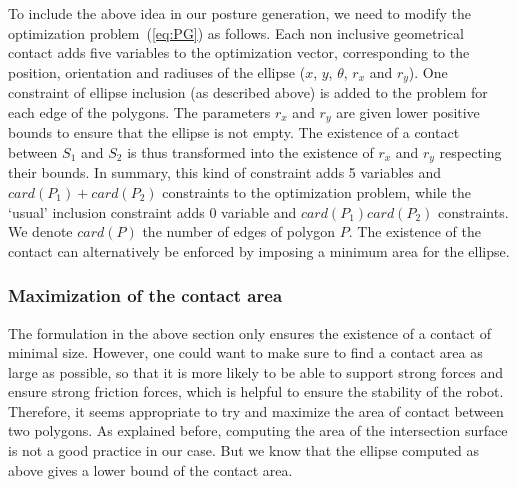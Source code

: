
To include the above idea in our posture generation, we need to modify the optimization problem~(\ref{eq:PG}) as follows.
Each non inclusive geometrical contact adds five variables to the optimization vector, corresponding to the position, orientation and radiuses of the ellipse ($x$, $y$, $\theta$, $r_x$ and $r_y$).
One constraint of ellipse inclusion (as described above) is added to the problem for each edge of the polygons.
The parameters $r_x$ and $r_y$ are given lower positive bounds to ensure that the ellipse is not empty.
The existence of a contact between $S_1$ and $S_2$ is thus transformed into the existence of $r_x$ and $r_y$ respecting their bounds.
In summary, this kind of constraint adds 5 variables and $card(P_1)+card(P_2)$ constraints to the optimization problem, while the `usual' inclusion constraint adds 0 variable and $card(P_1)card(P_2)$ constraints.
We denote $card(P)$ the number of edges of polygon $P$.
The existence of the contact can alternatively be enforced by imposing a minimum area for the ellipse.



\subsubsection{Maximization of the contact area}
\label{subsubsec:optim-ellipse-area}


The formulation in the above section only ensures the existence of a contact of minimal size.
However, one could want to make sure to find a contact area as large as possible, so that it is more likely to be able to support strong forces and ensure strong friction forces, which is helpful to ensure the stability of the robot.
Therefore, it seems appropriate to try and maximize the area of contact between two polygons.
As explained before, computing the area of the intersection surface is not a good practice in our case.
But we know that the ellipse computed as above gives a lower bound of the contact area.

